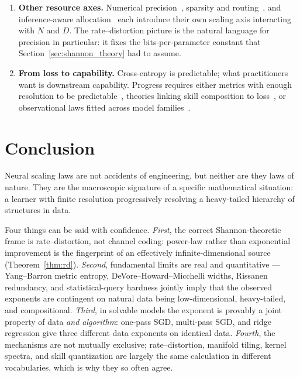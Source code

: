 \documentclass[11pt,a4paper]{article}
\theoremstyle{definition}
\begin{document}
\begin{enumerate}[leftmargin=2.0em]
  \item \textbf{Other resource axes.} Numerical precision~\cite{kumar2024precision}, sparsity and routing~\cite{clark2022unified,krajewski2024moe}, and inference-aware allocation~\cite{sardana2024beyond} each introduce their own scaling axis interacting with $N$ and $D$. The rate--distortion picture is the natural language for precision in particular: it fixes the bits-per-parameter constant that Section~\ref{sec:shannon_theory} had to assume.
  \item \textbf{From loss to capability.} Cross-entropy is predictable; what practitioners want is downstream capability. Progress requires either metrics with enough resolution to be predictable~\cite{hu2024predicting}, theories linking skill composition to loss~\cite{arora2023theory,michaud2023quantization}, or observational laws fitted across model families~\cite{ruan2024observational}.
\end{enumerate}

\section{Conclusion}
\label{sec:conclusion}

Neural scaling laws are not accidents of engineering, but neither are they laws of nature. They are the macroscopic signature of a specific mathematical situation: a learner with finite resolution progressively resolving a heavy-tailed hierarchy of structures in data.

Four things can be said with confidence. \emph{First}, the correct Shannon-theoretic frame is rate--distortion, not channel coding: power-law rather than exponential improvement is the fingerprint of an effectively infinite-dimensional source (Theorem~\ref{thm:rd}). \emph{Second}, fundamental limits are real and quantitative --- Yang--Barron metric entropy, DeVore--Howard--Micchelli widths, Rissanen redundancy, and statistical-query hardness jointly imply that the observed exponents are contingent on natural data being low-dimensional, heavy-tailed, and compositional. \emph{Third}, in solvable models the exponent is provably a joint property of data \emph{and algorithm}: one-pass SGD, multi-pass SGD, and ridge regression give three different data exponents on identical data. \emph{Fourth}, the mechanisms are not mutually exclusive; rate--distortion, manifold tiling, kernel spectra, and skill quantization are largely the same calculation in different vocabularies, which is why they so often agree.
\end{document}
